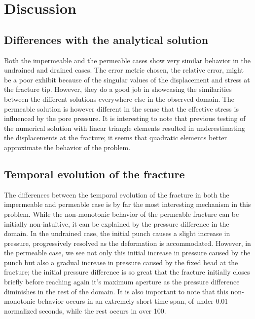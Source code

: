\documentclass{article}
\begin{document}
\FloatBarrier

\section{Discussion}

\subsection{Differences with the analytical solution}
Both the impermeable and the permeable cases show very similar behavior in the undrained and drained cases. The error metric chosen, the relative error, might be a poor exhibit because of the singular values of the displacement and stress at the fracture tip. However, they do a good job in showcasing the similarities between the different solutions everywhere else in the observed domain. The permeable solution is however different in the sense that the effective stress is influenced by the pore pressure. It is interesting to note that previous testing of the numerical solution with linear triangle elements resulted in underestimating the displacements at the fracture; it seems that quadratic elements better approximate the behavior of the problem.

\subsection{Temporal evolution of the fracture}
The differences between the temporal evolution of the fracture in both the impermeable and permeable case is by far the most interesting mechanism in this problem. While the non-monotonic behavior of the permeable fracture can be initially non-intuitive, it can be explained by the pressure difference in the domain. In the undrained case, the initial punch causes a slight increase in pressure, progressively resolved as the deformation is accommodated. However, in the permeable case, we see not only this initial increase in pressure caused by the punch but also a gradual increase in pressure caused by the fixed head at the fracture; the initial pressure difference is so great that the fracture initially closes briefly before reaching again it's maximum aperture as the pressure difference diminishes in the rest of the domain. It is also important to note that this non-monotonic behavior occurs in an extremely short time span, of under 0.01 normalized seconds, while the rest occurs in over 100. 
\end{document}
